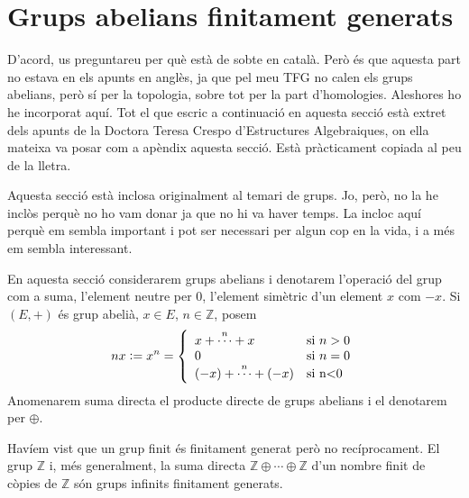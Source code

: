 \documentclass[../main.tex]{subfiles}
\begin{document}
\section{Grups abelians finitament generats}

D'acord, us preguntareu per què està de sobte en català. Però és que aquesta part no estava en els apunts en anglès, ja que pel meu TFG no calen els grups abelians, però sí per la topologia, sobre tot per la part d'homologies. Aleshores ho he incorporat aquí. Tot el que escric a continuació en aquesta secció està extret dels apunts de la Doctora Teresa Crespo d'Estructures Algebraiques, on ella mateixa va posar com a apèndix aquesta secció. Està pràcticament copiada al peu de la lletra. 

















Aquesta secció està inclosa originalment al temari de grups. Jo, però, no la he inclòs perquè no ho vam donar ja que no hi va haver temps. La incloc aquí perquè em sembla important i pot ser necessari per algun cop en la vida, i a més em sembla interessant.

En aquesta secció considerarem grups abelians i denotarem l'operació del grup com a suma, l'element neutre per 0, l'element simètric d'un element $x$ com $-x$. Si $(E,+)$ és grup abelià, $x\in E$, $n\in\mathbb{Z}$, posem 
\begin{equation}
    \notag
    nx := x^n = \left\{
    \begin{array}{ll}
        x+\overset{n}{\cdots}+x & \text{si $n>0$}\\
        0 & \text{si $n = 0$} \\
        (-x)+\overset{n}{\cdots}+(-x) & \text{si n<0}
    \end{array}
    \right.
\end{equation}
Anomenarem suma directa el producte directe de grups abelians i el denotarem per $\oplus$.

Havíem vist que un grup finit és finitament generat però no recíprocament. El grup $\mathbb{Z}$ i, més generalment, la suma directa $\mathbb{Z}\oplus\cdots\oplus\mathbb{Z}$ d'un nombre finit de còpies de $\mathbb{Z}$ són grups infinits finitament generats.
\end{document}
